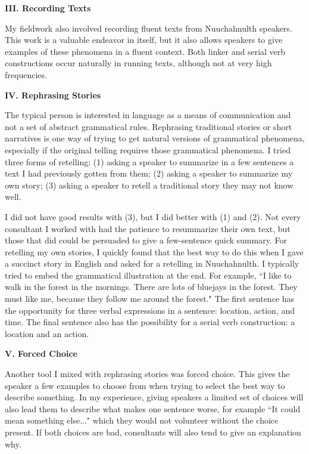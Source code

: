 \vspace{8pt}

\noindent \textbf{III. Recording Texts}

My fieldwork also involved recording fluent texts from Nuuchahnulth speakers. This work is a valuable endeavor in itself, but it also allows speakers to give examples of these phenomena in a fluent context. Both linker and serial verb constructions occur naturally in running texts, although not at very high frequencies.

\vspace{8pt}

\noindent \textbf{IV. Rephrasing Stories}

The typical person is interested in language as a means of communication and not a set of abstract grammatical rules. Rephrasing traditional stories or short narratives is one way of trying to get natural versions of grammatical phenomena, especially if the original telling requires those grammatical phenomena. I tried three forms of retelling: (1) asking a speaker to summarize in a few sentences a text I had previously gotten from them; (2) asking a speaker to summarize my own story; (3) asking a speaker to retell a traditional story they may not know well.

I did not have good results with (3), but I did better with (1) and (2). Not every consultant I worked with had the patience to resummarize their own text, but those that did could be persuaded to give a few-sentence quick summary. For retelling my own stories, I quickly found that the best way to do this when I gave a succinct story in English and asked for a retelling in Nuuchahnulth. I typically tried to embed the grammatical illustration at the end. For example, ``I like to walk in the forest in the mornings. There are lots of bluejays in the forest. They must like me, because they follow me around the forest." The first sentence has the opportunity for three verbal expressions in a sentence: location, action, and time. The final sentence also has the possibility for a serial verb construction: a location and an action.

\vspace{8pt}

\noindent \textbf{V. Forced Choice}

Another tool I mixed with rephrasing stories was forced choice. This gives the speaker a few examples to choose from when trying to select the best way to describe something. In my experience, giving speakers a limited set of choices will also lead them to describe what makes one sentence worse, for example ``It could mean something else..." which they would not volunteer without the choice present. If both choices are bad, consultants will also tend to give an explanation why.

